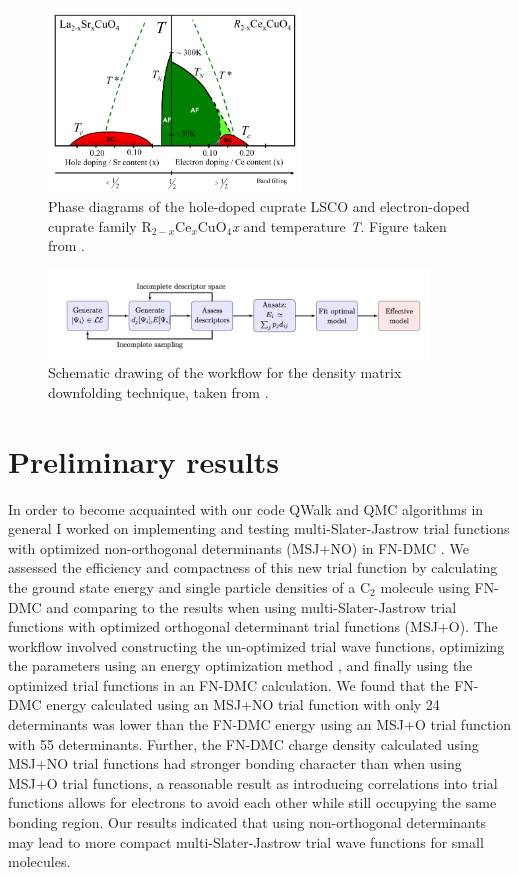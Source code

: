 \documentclass{article}
\begin{document}
\begin{figure}[H]
\centering
\includegraphics[width=0.6\textwidth]{Figures/I1-phase_diagram.png}
\caption{\label{fig1} Phase diagrams of the hole-doped cuprate LSCO and electron-doped cuprate family R$_{2-x}$Ce$_{x}$CuO$_4$\textit{x} and temperature \textit{T}. Figure taken from \cite{Armitage2010}. }
\end{figure}

\begin{figure}[H]
\centering
\includegraphics[width=0.9\textwidth]{Figures/I2-DMD_flow.png}
\caption{\label{fig2} Schematic drawing of the workflow for the density matrix downfolding technique, taken from \cite{10.3389/fphy.2018.00043}.}
\end{figure}

\section{Preliminary results}
In order to become acquainted with our code QWalk \cite{WAGNER20093390} and QMC algorithms in general I worked on implementing and testing multi-Slater-Jastrow trial functions with optimized non-orthogonal determinants (MSJ+NO) in FN-DMC \cite{Pathak2018}.
We assessed the efficiency and compactness of this new trial function by calculating the ground state energy and single particle densities of a C$_2$ molecule using FN-DMC and comparing to the results when using multi-Slater-Jastrow trial functions with optimized orthogonal determinant trial functions (MSJ+O). 
The workflow involved constructing the un-optimized trial wave functions, optimizing the parameters using an energy optimization method \cite{Toulouse2007}, and finally using the optimized trial functions in an FN-DMC calculation. 
We found that the FN-DMC energy calculated using an MSJ+NO trial function with only 24 determinants was lower than the FN-DMC energy using an MSJ+O trial function with 55 determinants. 
Further, the FN-DMC charge density calculated using MSJ+NO trial functions had stronger bonding character than when using MSJ+O trial functions, a reasonable result as introducing correlations into trial functions allows for electrons to avoid each other while still occupying the same bonding region. 
Our results indicated that using non-orthogonal determinants may lead to more compact multi-Slater-Jastrow trial wave functions for small molecules.
\end{document}
